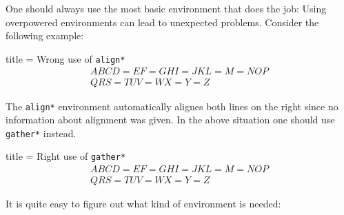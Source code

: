 \documentclass[a4paper, 10pt, headings=standardclasses, oneside, bibliography=totocnumbered]{scrbook}
\begin{document}
One should always use the most basic environment that does the job:
Using overpowered environments can lead to unexpected problems.
Consider the following example:
\begin{tcblisting}{title = {Wrong use of \texttt{align*}}}
\begin{align*}
  ABCD = EF = GHI = JKL = M = NOP
  \\
  QRS = TUV = WX = Y = Z
\end{align*}
\end{tcblisting}
The \texttt{align*} environment automatically alignes both lines on the right since no information about alignment was given.
In the above situation one should use \texttt{gather*} instead.
\begin{tcblisting}{title = {Right use of \texttt{gather*}}}
\begin{gather*}
  ABCD = EF = GHI = JKL = M = NOP
  \\
  QRS = TUV = WX = Y = Z
\end{gather*}
\end{tcblisting}
It is quite easy to figure out what kind of environment is needed:
\end{document}
